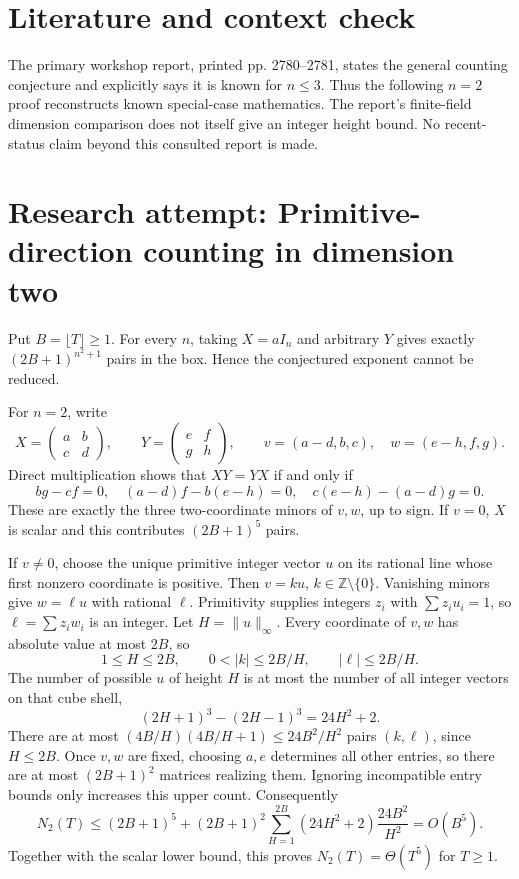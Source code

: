\documentclass[11pt]{article}
\begin{document}
\section{Literature and context check}
The primary workshop report, printed pp. 2780--2781, states the general counting conjecture and explicitly says it is known for $n\leq3$. Thus the following $n=2$ proof reconstructs known special-case mathematics. The report's finite-field dimension comparison does not itself give an integer height bound. No recent-status claim beyond this consulted report is made.
\section{Research attempt: Primitive-direction counting in dimension two}

Put $B=\lfloor T\rfloor\geq1$. For every $n$, taking $X=aI_n$ and arbitrary $Y$ gives exactly $(2B+1)^{n^2+1}$ pairs in the box. Hence the conjectured exponent cannot be reduced.

For $n=2$, write
\[
X=\begin{pmatrix}a&b\\c&d\end{pmatrix},\qquad
Y=\begin{pmatrix}e&f\\g&h\end{pmatrix},\qquad
v=(a-d,b,c),\quad w=(e-h,f,g).
\]
Direct multiplication shows that $XY=YX$ if and only if
\[
bg-cf=0,\quad (a-d)f-b(e-h)=0,\quad c(e-h)-(a-d)g=0.
\]
These are exactly the three two-coordinate minors of $v,w$, up to sign. If $v=0$, $X$ is scalar and this contributes $(2B+1)^5$ pairs.

If $v\ne0$, choose the unique primitive integer vector $u$ on its rational line whose first nonzero coordinate is positive. Then $v=ku$, $k\in\mathbb Z\setminus\{0\}$. Vanishing minors give $w=\ell u$ with rational $\ell$. Primitivity supplies integers $z_i$ with $\sum z_i u_i=1$, so $\ell=\sum z_iw_i$ is an integer. Let $H=\|u\|_\infty$. Every coordinate of $v,w$ has absolute value at most $2B$, so
\[
1\leq H\leq2B,\qquad 0<|k|\leq2B/H,\qquad |\ell|\leq2B/H.
\]
The number of possible $u$ of height $H$ is at most the number of all integer vectors on that cube shell,
\[
(2H+1)^3-(2H-1)^3=24H^2+2.
\]
There are at most $(4B/H)(4B/H+1)\leq24B^2/H^2$ pairs $(k,\ell)$, since $H\leq2B$. Once $v,w$ are fixed, choosing $a,e$ determines all other entries, so there are at most $(2B+1)^2$ matrices realizing them. Ignoring incompatible entry bounds only increases this upper count. Consequently
\[
N_2(T)\leq (2B+1)^5+(2B+1)^2
\sum_{H=1}^{2B}(24H^2+2)\frac{24B^2}{H^2}=O(B^5).
\]
Together with the scalar lower bound, this proves $N_2(T)=\Theta(T^5)$ for $T\geq1$.
\end{document}
